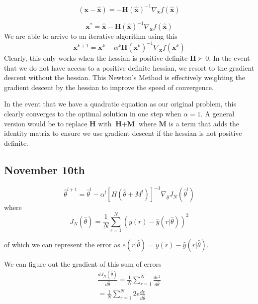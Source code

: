 \documentclass[11pt]{article}
\begin{document}
\begin{equation}
    (\textbf{x} - \hat{\textbf{x}}) = - \textbf{H} (\hat{\textbf{x}})^{-1} \nabla_{\textbf{x}} f(\hat{\textbf{x}})
\end{equation}

\begin{equation}
    \textbf{x}^* = \hat{\textbf{x}} - \textbf{H} (\hat{\textbf{x}})^{-1} \nabla_{\textbf{x}} f(\hat{\textbf{x}})
\end{equation}
We are able to arrive to an iterative algorithm using this
\begin{equation}
    \textbf{x}^{k+1} = \textbf{x}^k - \alpha^k \textbf{H} (\textbf{x}^k)^{-1} \nabla_{\textbf{x}} f(\textbf{x}^k)
\end{equation}
Clearly, this only works when the hessian is positive definite $\textbf{H} \succ 0$.
In the event that we do not have access to a positive definite hessian, we resort to the gradient descent without the hessian.
This Newton's Method is effectively weighting the gradient descent by the hessian to improve the speed of convergence.

In the event that we have a quadratic equation as our original problem, this clearly converges to the optimal solution in one step when $\alpha = 1$.
A general version would be to replace $\textbf{H}$ with $\textbf{H} + \textbf{M}$ where $\textbf{M}$ is a term that adds the identity matrix to ensure we use gradient descent if the hessian is not positive definite.

\subsection{November 10th}

\begin{equation}
    \hat{\theta}^{l+1} = \hat{\theta}^l - \alpha^l [H(\hat{\theta} + M^l)]^{-1} \nabla_{\hat{\theta}} J_N (\hat{\theta}^l)
\end{equation}
where
\begin{equation}
    J_N(\hat{\theta}) = \frac{1}{N} \sum_{r=1}^{N} (y(r) - \hat{y}(r | \hat{\theta}))^2
\end{equation}

of which we can represent the error as $e(r|\hat{\theta}) = y(r) - \hat{y}(r | \hat{\theta}) $.

We can figure out the gradient of this sum of errors
\begin{gather}
    \frac{d J_N (\hat{\theta})}{d \hat{\theta}} = \frac{1}{N} \sum_{r=1}^{N} \frac{d e^2}{d \hat{\theta}} \\
    = \frac{1}{N}   \sum_{r=1}^{N} 2 e \frac{d e}{d \hat{\theta}} 
\end{gather}
\end{document}
